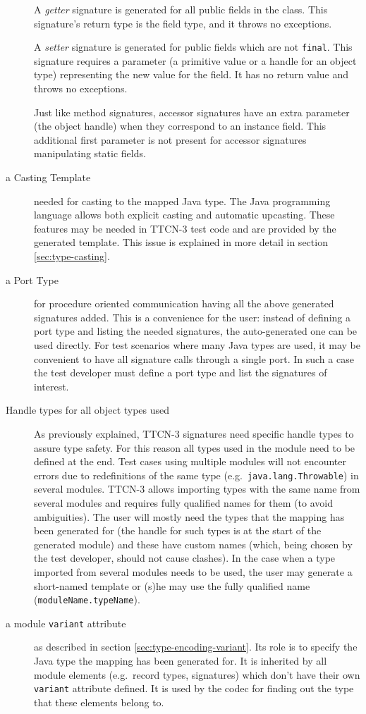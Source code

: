 \begin{description}
A \emph{getter} signature is generated for all public fields in the class.
This signature's return type is the field type, and it throws no exceptions.

A \emph{setter} signature is generated for public fields
which are not \verb=final=.
This signature requires a parameter
(a primitive value or a handle for an object type)
representing the new value for the field.
It has no return value and throws no exceptions.

Just like method signatures, accessor signatures have an extra parameter
(the object handle) when they correspond to an instance field.
This additional first parameter is not present
for accessor signatures manipulating static fields.

\item[a Casting Template]
needed for casting to the mapped Java type.
The Java programming language allows
both explicit casting and automatic upcasting.
These features may be needed in \ac{TTCN-3} test code
and are provided by the generated template.
This issue is explained in more detail in section \ref{sec:type-casting}.

\item[a Port Type]
for procedure oriented communication
having all the above generated signatures added.
This is a convenience for the user:
instead of defining a port type and listing the needed signatures,
the auto-generated one can be used directly.
For test scenarios where many Java types are used,
it may be convenient to have all signature calls through a single port.
In such a case the test developer must define a port type
and list the signatures of interest.

\item[Handle types for all object types used]
As previously explained, \ac{TTCN-3} signatures need specific handle types
to assure type safety.
For this reason all types used in the module need to be defined at the end.
Test cases using multiple modules will not encounter errors
due to redefinitions of the same type
(e.g.\ \texttt{java.lang.Throwable}) in several modules.
\ac{TTCN-3} allows importing types with the same name from several modules
and requires fully qualified names for them (to avoid ambiguities).
The user will mostly need the types that the mapping has been generated for
(the handle for such types is at the start of the generated module)
and these have custom names
(which, being chosen by the test developer, should not cause clashes).
In the case when a type imported from several modules needs to be used,
the user may generate a short-named template
or (s)he may use the fully qualified name (\texttt{moduleName.typeName}).

\item[a module \texttt{variant} attribute]
as described in section \ref{sec:type-encoding-variant}.
Its role is to specify the Java type the mapping has been generated for.
It is inherited by all module elements (e.g.\ record types, signatures)
which don't have their own \texttt{variant} attribute defined.
It is used by the codec for finding out the type that these elements belong to.

\end{description}

